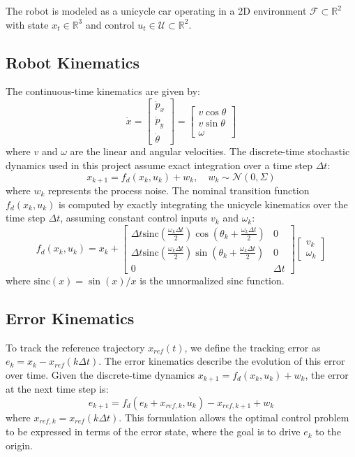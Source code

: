 \documentclass[conference]{IEEEtran}
\begin{document}
The robot is modeled as a unicycle car operating in a 2D environment $\mathcal{F} \subset \mathbb{R}^2$ with state $x_t \in \mathbb{R}^3$ and control $u_t \in \mathcal{U} \subset \mathbb{R}^2$.

\subsection{Robot Kinematics}
The continuous-time kinematics are given by:
\begin{equation}
    \dot{x} = \begin{bmatrix} \dot{p}_x \\ \dot{p}_y \\ \dot{\theta} \end{bmatrix} = \begin{bmatrix} v \cos \theta \\ v \sin \theta \\ \omega \end{bmatrix}
\end{equation}
where $v$ and $\omega$ are the linear and angular velocities. The discrete-time stochastic dynamics used in this project assume exact integration over a time step $\Delta t$:
\begin{equation}
    x_{k+1} = f_d(x_k, u_k) + w_k, \quad w_k \sim \mathcal{N}(0, \Sigma)
\end{equation}
where $w_k$ represents the process noise. The nominal transition function $f_d(x_k, u_k)$ is computed by exactly integrating the unicycle kinematics over the time step $\Delta t$, assuming constant control inputs $v_k$ and $\omega_k$:
\begin{equation}
    f_d(x_k, u_k) = x_k + \begin{bmatrix}
        \Delta t \text{sinc}(\frac{\omega_k \Delta t}{2}) \cos(\theta_k + \frac{\omega_k \Delta t}{2}) & 0 \\
        \Delta t \text{sinc}(\frac{\omega_k \Delta t}{2}) \sin(\theta_k + \frac{\omega_k \Delta t}{2}) & 0 \\
        0 & \Delta t
    \end{bmatrix} \begin{bmatrix} v_k \\ \omega_k \end{bmatrix}
\end{equation}
where $\text{sinc}(x) = \sin(x)/x$ is the unnormalized sinc function.

\subsection{Error Kinematics}
To track the reference trajectory $x_{ref}(t)$, we define the tracking error as $e_k = x_k - x_{ref}(k\Delta t)$. The error kinematics describe the evolution of this error over time. Given the discrete-time dynamics $x_{k+1} = f_d(x_k, u_k) + w_k$, the error at the next time step is:
\begin{equation}
    e_{k+1} = f_d(e_k + x_{ref, k}, u_k) - x_{ref, k+1} + w_k
\end{equation}
where $x_{ref, k} = x_{ref}(k\Delta t)$. This formulation allows the optimal control problem to be expressed in terms of the error state, where the goal is to drive $e_k$ to the origin.
\end{document}
